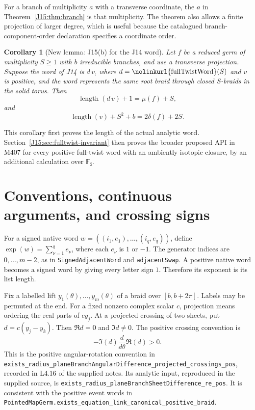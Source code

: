 \documentclass[11pt,oneside]{report}
\newtheorem{corollary}[theorem]{Corollary}
\theoremstyle{definition}
\numberwithin{equation}{section}
\newcommand{\decl}[1]{\textnormal{\nolinkurl{#1}}}
\newcommand{\Exp}{\operatorname{exp}}
\newcommand{\length}{\operatorname{length}}
\begin{document}
For a branch of multiplicity $a$ with a transverse coordinate, the $a$ in
Theorem~\ref{J15:thm:branch} is that multiplicity. The theorem also allows a
finite projection of larger degree, which is useful because the catalogued
branch-component-order declaration specifies a coordinate order.

\begin{corollary}[New lemma: J15(b) for the J14 word]
\label{J15:cor:fulltwist}
Let $f$ be a reduced germ of multiplicity $S\ge1$ with $b$ irreducible
branches, and use a transverse projection. Suppose the word of J14 is
$d\,v$, where $d=\decl{fullTwistWord}(S)$ and $v$ is positive, and the
word represents the same root braid through closed $S$-braids in the
solid torus. Then
\begin{equation}\label{J15:eq:full-length}
 \length(d\,v)+1=\mu(f)+S,
\end{equation}
and
\begin{equation}\label{J15:eq:tail-length}
 \length(v)+S^2+b=2\delta(f)+2S.
\end{equation}
\end{corollary}

This corollary first proves the length of the actual analytic word.
Section~\ref{J15:sec:fulltwist-invariant} then proves the broader proposed
API in M407 for every positive full-twist word with an ambiently isotopic
closure, by an additional calculation over $\mathbb F_2$.

\section{Conventions, continuous arguments, and crossing signs}

For a signed native word
$w=((i_1,e_1),\ldots,(i_q,e_q))$, define
$\Exp(w)=\sum_{\nu=1}^q e_\nu$, where each $e_\nu$ is $1$ or $-1$.
The generator indices are $0,\ldots,m-2$, as in
\decl{SignedAdjacentWord} and \decl{adjacentSwap}.
A positive native word becomes a signed word by giving every letter sign
$1$. Therefore its exponent is its list length.

Fix a labelled lift $y_1(\theta),\ldots,y_m(\theta)$ of a braid over
$[b,b+2\pi]$. Labels may be permuted at the end. For a fixed nonzero
complex scalar $c$, projection means ordering the real parts of $c y_j$.
At a projected crossing of two sheets, put
$d=c(y_j-y_k)$. Then $\Re d=0$ and $\Im d\ne0$.
The positive crossing convention is
\begin{equation}\label{J15:eq:cross-sign}
 -\Im(d)\frac{d}{d\theta}\Re(d)>0.
\end{equation}
This is the positive angular-rotation convention in
\decl{exists_radius_planeBranchAngularDifference_projected_crossings_pos},
recorded in L4.16 of the supplied notes. Its analytic input, reproduced in
the supplied source, is
\decl{exists_radius_planeBranchSheetDifference_re_pos}.
It is consistent with the positive event words in
\decl{PointedMapGerm.exists_equation_link_canonical_positive_braid}.
\end{document}
